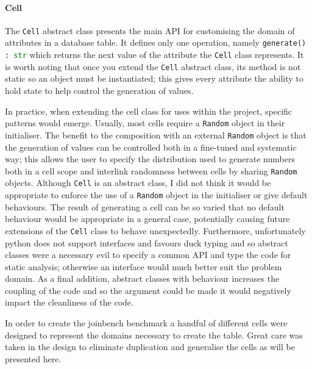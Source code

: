 \paragraph{Cell} The \lstinline{Cell} abstract class presents the main API for
customising the domain of attributes in a database table. It defines only one
operation, namely \lstinline[language=Python]{generate() : str} which returns the next value of
the attribute the \lstinline{Cell} class represents. It is worth noting that
once you extend the \lstinline{Cell} abstract class, its method is not static so
an object must be instantiated; this gives every attribute the ability to hold
state to help control the generation of values.

In practice, when extending the cell class for uses within the project, specific
patterns would emerge. Usually, most cells require a
\lstinline{Random} object in their initialiser. The benefit to the composition
with an external \lstinline{Random} object is that the generation of values can
be controlled both in a fine-tuned and systematic way; this allows the user to
specify the distribution used to generate numbers both in a cell scope and
interlink randomness between cells by sharing \lstinline{Random} objects.
Although \lstinline{Cell} is an abstract class, I did not think it would be
appropriate to enforce the use of a \lstinline{Random} object in the initialiser
or give default behaviours. The result of generating a cell can be so varied
that no default behaviour would be appropriate in a general case, potentially
causing future extensions of the \lstinline{Cell} class to behave unexpectedly.
Furthermore, unfortunately python does not support interfaces and favours duck
typing and so abstract classes were a necessary evil to specify a common API and
type the code for static analysis; otherwise an interface would much better suit
the problem domain. As a final addition, abstract classes with behaviour
increases the coupling of the code and so the argument could be made it would
negatively impact the cleanliness of the code.

In order to create the joinbench benchmark a handful of different cells were
designed to represent the domains necessary to create the 
table. Great care was taken in the design to eliminate duplication and
generalise the cells as will be presented here.

